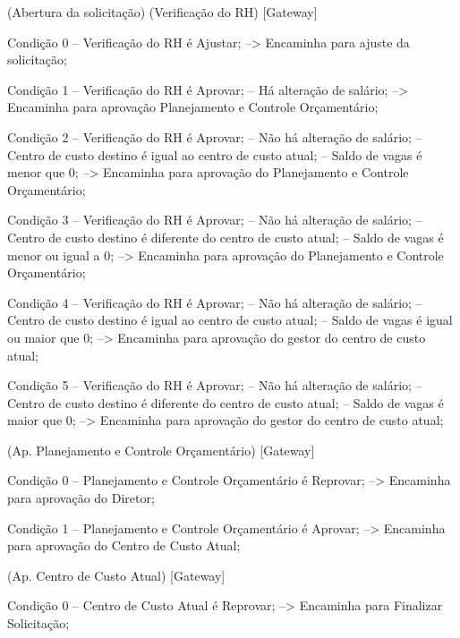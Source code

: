 
(Abertura da solicitação)
   (Verificação do RH)
      [Gateway]

         Condição 0
            -- Verificação do RH é Ajustar;
               --> Encaminha para ajuste da solicitação;

         Condição 1
            -- Verificação do RH é Aprovar;
            -- Há alteração de salário;
               --> Encaminha para aprovação Planejamento e Controle Orçamentário;

         Condição 2
            -- Verificação do RH é Aprovar;
            -- Não há alteração de salário;
            -- Centro de custo destino é igual ao centro de custo atual;
            -- Saldo de vagas é menor que 0;
               --> Encaminha para aprovação do Planejamento e Controle Orçamentário;

         Condição 3
            -- Verificação do RH é Aprovar;
            -- Não há alteração de salário;
            -- Centro de custo destino é diferente do centro de custo atual;
            -- Saldo de vagas é menor ou igual a 0;
               --> Encaminha para aprovação do Planejamento e Controle Orçamentário;

         Condição 4
            -- Verificação do RH é Aprovar;
            -- Não há alteração de salário;
            -- Centro de custo destino é igual ao centro de custo atual;
            -- Saldo de vagas é igual ou maior que 0;
               --> Encaminha para aprovação do gestor do centro de custo atual;

         Condição 5
            -- Verificação do RH é Aprovar;
            -- Não há alteração de salário;
            -- Centro de custo destino é diferente do centro de custo atual;
            -- Saldo de vagas é maior que 0;
               --> Encaminha para aprovação do gestor do centro de custo atual;


         (Ap. Planejamento e Controle Orçamentário)
            [Gateway]

               Condição 0
                  -- Planejamento e Controle Orçamentário é Reprovar;
                     --> Encaminha para aprovação do Diretor;

               Condição 1
                  -- Planejamento e Controle Orçamentário é Aprovar;
                     --> Encaminha para aprovação do Centro de Custo Atual;

         (Ap. Centro de Custo Atual)
            [Gateway]

               Condição 0
                  -- Centro de Custo Atual é Reprovar;
                     --> Encaminha para Finalizar Solicitação;

